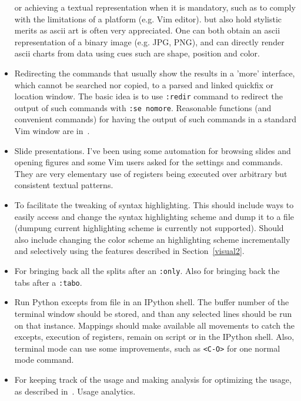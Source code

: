 \documentclass{article}
\newcommand{\ttt}[1] {
	\texttt{<#1>}}
\newcommand{\tttt}[1]{\texttt{#1}}
\begin{document}
\begin{itemize}
        or achieving a textual representation when it is mandatory,
        such as to comply with the limitations of a platform (e.g. Vim editor). 
        but also hold stylistic merits as ascii art is often
        very appreciated.
        One can both obtain an ascii representation of a binary image (e.g. JPG, PNG),
        and can directly render ascii charts from data using cues such are shape, position
        and color.
      \item Redirecting the commands that usually show the results in a 'more' interface,
        which cannot be searched nor copied,
        to a parsed and linked quickfix or location window.
        The basic idea is to use \tttt{:redir} command to redirect the output
        of such commands with \tttt{:se nomore}.
        Reasonable functions (and convenient commands) for having the
        output of such commands in a standard Vim window are
        in~\cite{vimrc}.
      \item Slide presentations. I've been using some automation for browsing
        slides and opening figures and some Vim users asked for the settings and
        commands. They are very elementary use of registers being executed over
        arbitrary but consistent textual patterns.
      \item To facilitate the tweaking of syntax highlighting.
        This should include ways to easily access and change the
        syntax highlighting scheme and dump it to a file (dumpung
        current highlighting scheme is currently not supported).
        Should also include changing the color scheme an highlighting scheme incrementally
        and selectively using the features described in Section~\ref{visual2}.
      \item For bringing back all the splits after an \tttt{:only}.
        Also for bringing back the tabs after a \tttt{:tabo}.
      \item Run Python excepts from file in an IPython shell. 
        The buffer number of the terminal window should be stored,
        and than any selected lines should be run on that instance.
        Mappings should make available all movements to catch the excepts,
        execution of registers, remain on script or in the IPython shell.
        Also, terminal mode can use some improvements, such as \ttt{C-O} for
        one normal mode command.
      \item For keeping track of the usage and making analysis
        for optimizing the usage, as described in~\cite{http://www.drbunsen.org/vim-croquet/}. Usage analytics.

\end{itemize}
\end{document}
